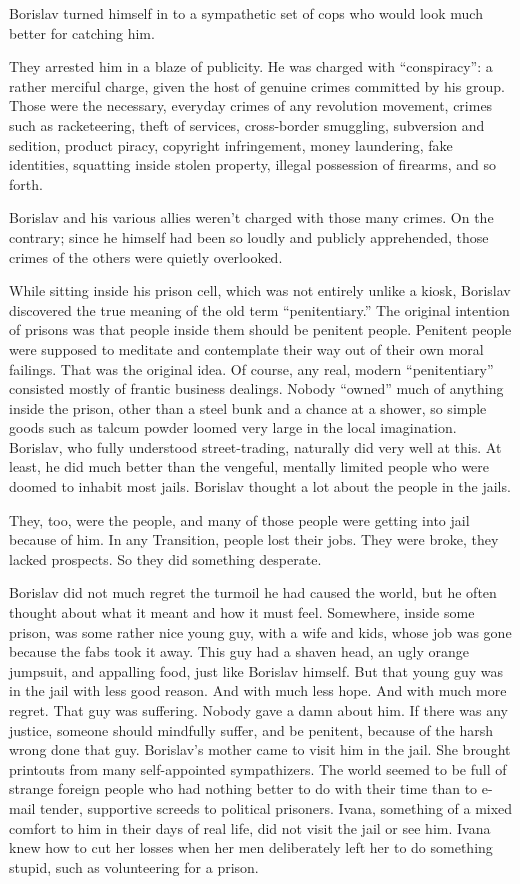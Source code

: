 \documentclass[20 pt,twoside,extrafontsizes,final]{memoir}
\begin{document}
Borislav turned himself in to a sympathetic set of cops who would look much better for catching him.

They arrested him in a blaze of publicity. He was charged with ``conspiracy'': a rather merciful charge, given the host of genuine crimes committed by his group. Those were the necessary, everyday crimes of any revolution movement, crimes such as racketeering, theft of services, cross-border smuggling, subversion and sedition, product piracy, copyright infringement, money laundering, fake identities, squatting inside stolen property, illegal possession of firearms, and so forth.

Borislav and his various allies weren't charged with those many crimes. On the contrary; since he himself had been so loudly and publicly apprehended, those crimes of the others were quietly overlooked.

While sitting inside his prison cell, which was not entirely unlike a kiosk, Borislav discovered the true meaning of the old term ``penitentiary.'' The original intention of prisons was that people inside them should be penitent people. Penitent people were supposed to meditate and contemplate their way out of their own moral failings. That was the original idea.
Of course, any real, modern ``penitentiary'' consisted mostly of frantic business dealings. Nobody ``owned'' much of anything inside the prison, other than a steel bunk and a chance at a shower, so simple goods such as talcum powder loomed very large in the local imagination. Borislav, who fully understood street-trading, naturally did very well at this. At least, he did much better than the vengeful, mentally limited people who were doomed to inhabit most jails. Borislav thought a lot about the people in the jails.

They, too, were the people, and many of those people were getting into jail because of him. In any Transition, people lost their jobs. They were broke, they lacked prospects. So they did something desperate.

Borislav did not much regret the turmoil he had caused the world, but he often thought about what it meant and how it must feel. Somewhere, inside some prison, was some rather nice young guy, with a wife and kids, whose job was gone because the fabs took it away. This guy had a shaven head, an ugly orange jumpsuit, and appalling food, just like Borislav himself. But that young guy was in the jail with less good reason. And with much less hope. And with much more regret. That guy was suffering. Nobody gave a damn about him. If there was any justice, someone should mindfully suffer, and be penitent, because of the harsh wrong done that guy.
Borislav's mother came to visit him in the jail. She brought printouts from many self-appointed sympathizers. The world seemed to be full of strange foreign people who had nothing better to do with their time than to e-mail tender, supportive screeds to political prisoners. Ivana, something of a mixed comfort to him in their days of real life, did not visit the jail or see him. Ivana knew how to cut her losses when her men deliberately left her to do something stupid, such as volunteering for a prison. 
\end{document}
